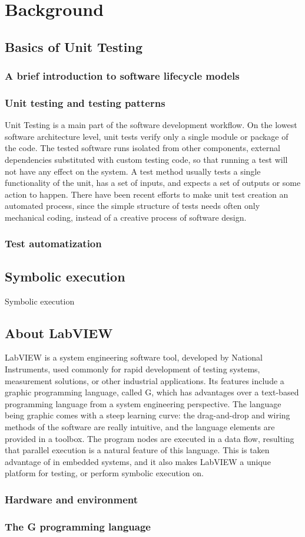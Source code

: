\chapter{Background}
\section{Basics of Unit Testing}
\subsection{A brief introduction to software lifecycle models}
\subsection{Unit testing and testing patterns}
Unit Testing is a main part of the software development workflow. On the lowest software architecture level, unit tests verify only a single module or package of the code. The tested software runs isolated from other components, external dependencies substituted with custom testing code, so that running a test will not have any effect on the system. A test method usually tests a single functionality of the unit, has a set of inputs, and expects a set of outputs or some action to happen. There have been recent efforts to make unit test creation an automated process, since the simple structure of tests needs often only mechanical coding, instead of a creative process of software design. 
\subsection{Test automatization}
\section{Symbolic execution}

Symbolic execution \cite{King:1976:SEP:360248.360252}
\section{About LabVIEW}
LabVIEW is a system engineering software tool, developed by National Instruments, used commonly for rapid development of testing systems, measurement solutions, or other industrial applications. Its features include a graphic programming language, called G, which has advantages over a text-based programming language from a system engineering perspective. The language being graphic comes with a steep learning curve: the drag-and-drop and wiring methods of the software are really intuitive, and the language elements are provided in a toolbox. The program nodes are executed in a data flow, resulting that parallel execution is a natural feature of this language. This is taken advantage of in embedded systems, and it also makes LabVIEW a unique platform for testing, or perform symbolic execution on.
\subsection{Hardware and environment}
\subsection{The G programming language}